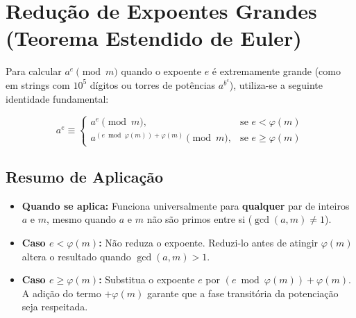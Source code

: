 \section{Redução de Expoentes Grandes (Teorema Estendido de Euler)}

Para calcular $a^e \pmod m$ quando o expoente $e$ é extremamente grande (como em strings com $10^5$ dígitos ou torres de potências $a^{b^c}$), utiliza-se a seguinte identidade fundamental:

$$a^e \equiv \begin{cases} 
a^e \pmod m, & \text{se } e < \varphi(m) \\[6pt]
a^{(e \bmod \varphi(m)) + \varphi(m)} \pmod m, & \text{se } e \ge \varphi(m)
\end{cases}$$

\subsection{Resumo de Aplicação}

\begin{itemize}
    \item \textbf{Quando se aplica:} Funciona universalmente para \textbf{qualquer} par de inteiros $a$ e $m$, mesmo quando $a$ e $m$ não são primos entre si ($\gcd(a, m) \neq 1$).
    \item \textbf{Caso $e < \varphi(m)$:} Não reduza o expoente. Reduzi-lo antes de atingir $\varphi(m)$ altera o resultado quando $\gcd(a, m) > 1$.
    \item \textbf{Caso $e \ge \varphi(m)$:} Substitua o expoente $e$ por $(e \bmod \varphi(m)) + \varphi(m)$. A adição do termo $+\varphi(m)$ garante que a fase transitória da potenciação seja respeitada.
\end{itemize}

